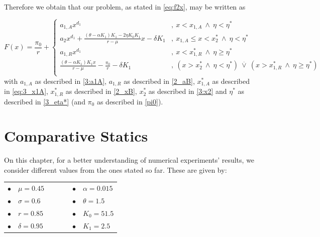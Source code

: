 Therefore we obtain that our problem, as stated in \eqref{eq:f2x}, may be written as

\begin{equation}
F(x)=\frac{\pi_0}{r} + \begin{cases}
a_{1,A}x^{d_1}  &, \ x<x_{1,A} \  \wedge \ \eta<\eta^*\\
a_2x^{d_1}+\frac{(\theta-\alpha K_1)K_1-2 \eta K_0 K_1}{r-\mu} x - \delta K_1 &, \ x_{1,A} \leq x < x_2^* \ \wedge \ \eta<\eta^*\\
a_{1,R}x^{d_1} &, \ x<x_{1,R}^*  \ \wedge \ \eta\geq \eta^* \\
\frac{(\theta-\alpha K_1)K_1 x}{r-\mu} -\frac{\pi_0}{r} - \delta K_1   &, \ ( x>x_2^* \ \wedge \ \eta<\eta^*) \ \overset{.}{\vee} \ (x>x_{1,R}^* \ \wedge \ \eta \geq \eta^*) \\
\end{cases}
	\label{3_madzbigboy}
\end{equation}
with $a_{1,A}$ as described in \eqref{3:a1A}, $a_{1,R}$ as described in \eqref{2_aB}, $x^*_{1,A}$ as described in \eqref{eq:3_x1A}, $x^*_{1,R}$ as described in \eqref{2_xB}, $x^*_2$ as described in \eqref{3:x2} and $\eta^*$ as described in \eqref{3_eta*} (and $\pi_0$ as described in \eqref{pi0}).


\section{Comparative Statics}


On this chapter, for a better understanding of numerical experiments' results, we consider different values from the ones stated so far. These are given by:
\begin{table}[!htb]
	\centering
	\begin{tabular}{lllllll}
		$\bullet$ & $\mu=0.45$     &  & \hspace{7cm} &  &  $\bullet$ & $\alpha=0.015$ \\
		$\bullet$ & $\sigma=0.6$ &  & \hspace{7cm} &  &  $\bullet$ & $\theta=1.5$   \\
		$\bullet$ & $r=0.85$       &  & \hspace{7cm} &  &  $\bullet$ & $K_0=51.5$       \\
		$\bullet$ & $\delta=0.95$     &  & \hspace{7cm} & &  $\bullet$ & $K_1=2.5$                              
	\end{tabular}
\end{table}


